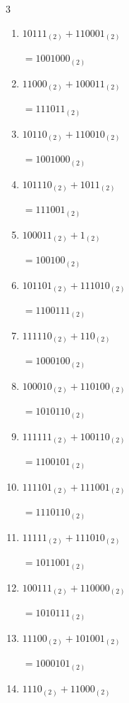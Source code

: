\begin{multicols}{3}
\begin{enumerate}
        $=1110101_{(2)}$

  \item $10111_{(2)} + 110001_{(2)}$

        $=1001000_{(2)}$

  \item $11000_{(2)} + 100011_{(2)}$

        $=111011_{(2)}$

  \item $10110_{(2)} + 110010_{(2)}$

        $=1001000_{(2)}$

  \item $101110_{(2)} + 1011_{(2)}$

        $=111001_{(2)}$

\columnbreak %

  \item $100011_{(2)} + 1_{(2)}$

        $=100100_{(2)}$

  \item $101101_{(2)} + 111010_{(2)}$

        $=1100111_{(2)}$

  \item $111110_{(2)} + 110_{(2)}$

        $=1000100_{(2)}$

  \item $100010_{(2)} + 110100_{(2)}$

        $=1010110_{(2)}$

  \item $111111_{(2)} + 100110_{(2)}$

        $=1100101_{(2)}$

  \item $111101_{(2)} + 111001_{(2)}$

        $=1110110_{(2)}$

  \item $11111_{(2)} + 111010_{(2)}$

        $=1011001_{(2)}$

  \item $100111_{(2)} + 110000_{(2)}$

        $=1010111_{(2)}$

  \item $11100_{(2)} + 101001_{(2)}$

        $=1000101_{(2)}$

  \item $1110_{(2)} + 11000_{(2)}$


\end{enumerate}
\end{multicols}
